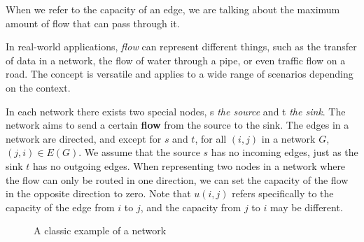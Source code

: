 When we refer to the capacity of an edge, we are talking about the maximum amount of flow that can pass through it.

In real-world applications, \textit{flow} can represent different things, such as the transfer of data in a network, the flow of water through a pipe, or even traffic flow on a road. The concept is versatile and applies to a wide range of scenarios depending on the context.

In each network there exists two special nodes, s \textit{the source} and t \textit{the sink}. The network aims to send a certain \textbf{flow} from the source to the sink.
The edges in a network are directed, and except for $s$ and $t$, for all $(i,j)$ in a network $G$, $(j,i) \in E(G)$. We assume that the source $s$ has no incoming edges, just as the sink $t$ has no outgoing edges.
When representing two nodes in a network where the flow can only be routed in one direction, we can set the capacity of the flow in the opposite direction to zero.
Note that $u(i,j)$ refers specifically to the capacity of the edge from $i$ to $j$, and the capacity from $j$ to $i$ may be different.

\begin{figure}[h]
    \centering
    \caption{A classic example of a network}
\end{figure}



